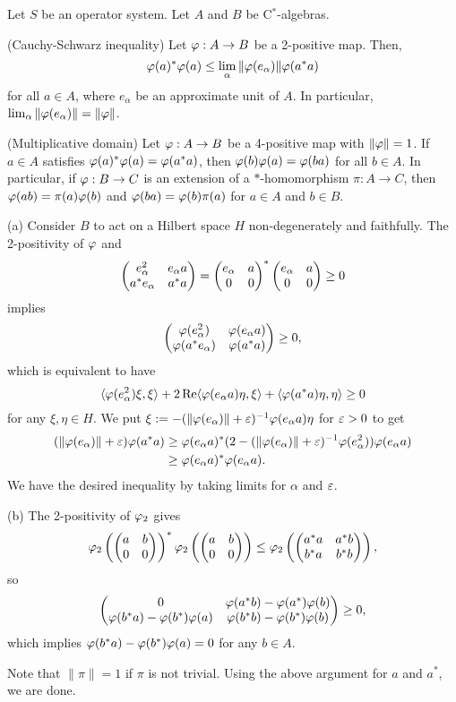 \documentclass{../../large}
\begin{document}
\begin{prb}
Let $S$ be an operator system.
Let $A$ and $B$ be C$^*$-algebras.
\begin{parts}
\item (Cauchy-Schwarz inequality)
Let $\varphi:A\to B$ be a 2-positive map.
Then,
\[\varphi(a)^*\varphi(a)\le\lim_\alpha\|\varphi(e_\alpha)\|\varphi(a^*a)\] for all $a\in A$, where $e_\alpha$ be an approximate unit of $A$.
In particular, $\lim_\alpha\|\varphi(e_\alpha)\|=\|\varphi\|$.
\item (Multiplicative domain)
Let $\varphi:A\to B$ be a 4-positive map with $\|\varphi\|=1$.
If $a\in A$ satisfies $\varphi(a)^*\varphi(a)=\varphi(a^*a)$, then $\varphi(b)\varphi(a)=\varphi(ba)$ for all $b\in A$.
In particular, if $\varphi:B\to C$ is an extension of a $*$-homomorphism $\pi:A\to C$, then $\varphi(ab)=\pi(a)\varphi(b)$ and $\varphi(ba)=\varphi(b)\pi(a)$ for $a\in A$ and $b\in B$.
\end{parts}
\end{prb}
\begin{pf}
(a)
Consider $B$ to act on a Hilbert space $H$ non-degenerately and faithfully.
The 2-positivity of $\varphi$ and
\[\begin{pmatrix}e_\alpha^2&e_\alpha a\\a^*e_\alpha&a^*a\end{pmatrix}=\begin{pmatrix}e_\alpha&a\\0&0\end{pmatrix}^*\begin{pmatrix}e_\alpha&a\\0&0\end{pmatrix}\ge0\]
implies
\[\begin{pmatrix}\varphi(e_\alpha^2)&\varphi(e_\alpha a)\\\varphi(a^*e_\alpha)&\varphi(a^*a)\end{pmatrix}\ge0,\]
which is equivalent to have
\[\langle\varphi(e_\alpha^2)\xi,\xi\rangle+2\operatorname{Re}\langle\varphi(e_\alpha a)\eta,\xi\rangle+\langle\varphi(a^*a)\eta,\eta\rangle\ge0\]
for any $\xi,\eta\in H$.
We put $\xi:=-(\|\varphi(e_\alpha)\|+\varepsilon)^{-1}\varphi(e_\alpha a)\eta$ for $\varepsilon>0$ to get
\begin{align*}
(\|\varphi(e_\alpha)\|+\varepsilon)\varphi(a^*a)
&\ge\varphi(e_\alpha a)^*(2-(\|\varphi(e_\alpha)\|+\varepsilon)^{-1}\varphi(e_\alpha^2))\varphi(e_\alpha a)\\
&\ge\varphi(e_\alpha a)^*\varphi(e_\alpha a).
\end{align*}
We have the desired inequality by taking limits for $\alpha$ and $\varepsilon$.

(b)
The 2-positivity of $\varphi_2$ gives
\[\varphi_2\left(\begin{pmatrix}a&b\\0&0\end{pmatrix}\right)^*\varphi_2\left(\begin{pmatrix}a&b\\0&0\end{pmatrix}\right)\le\varphi_2\left(\begin{pmatrix}a^*a&a^*b\\b^*a&b^*b\end{pmatrix}\right),\]
so
\[\begin{pmatrix}0&\varphi(a^*b)-\varphi(a^*)\varphi(b)\\\varphi(b^*a)-\varphi(b^*)\varphi(a)&\varphi(b^*b)-\varphi(b^*)\varphi(b)\end{pmatrix}\ge0,\]
which implies $\varphi(b^*a)-\varphi(b^*)\varphi(a)=0$ for any $b\in A$.

Note that $\|\pi\|=1$ if $\pi$ is not trivial.
Using the above argument for $a$ and $a^*$, we are done.
\end{pf}
\end{document}
